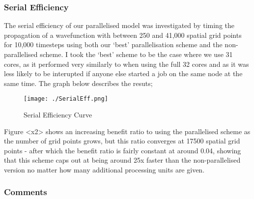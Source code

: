 \subsubsection{Serial Efficiency}
The serial efficiency of our parallelised model was investigated by timing the propagation of a wavefunction with between 250 and 41,000 spatial grid points for 10,000 timesteps using both our `best' parallelisation scheme and the non-parallelised scheme. I took the `best' scheme to be the case where we use 31 cores, as it performed very similarly to when using the full 32 cores and as it was less likely to be interupted if anyone else started a job on the same node at the same time. The graph below describes the resuts;

\begin{figure}[H]
         \texttt{[image: ./SerialEff.png]}
         \centering
         \caption{Serial Efficiency Curve}
\end{figure}


Figure <x2> shows an increasing benefit ratio to using the parallelised scheme as the number of grid points grows, but this ratio converges at 17500 spatial grid points - after which the benefit ratio is fairly constant at around 0.04, showing that this scheme caps out at being around 25x faster than the non-parallelised version no matter how many additional processing units are given.

\subsubsection{Comments}

